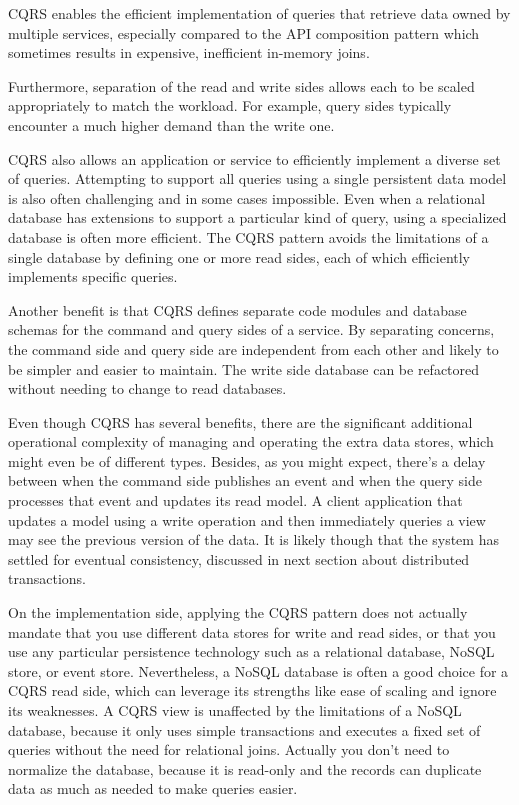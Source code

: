 \documentclass[conference]{IEEEtran}
\begin{document}
CQRS enables the efficient implementation of queries that retrieve data owned by multiple services, especially compared to the API composition pattern which sometimes results in expensive, inefficient in-memory joins.

Furthermore, separation of the read and write sides allows each to be scaled appropriately to match the workload. For example, query sides typically encounter a much higher demand than the write one.

CQRS also allows an application or service to efficiently implement a diverse set of queries. Attempting to support all queries using a single persistent data model is also often challenging and in some cases impossible. Even when a relational database has extensions to support a particular kind of query, using a specialized database is often more efficient. The CQRS pattern avoids the limitations of a single database by defining one or more read sides, each of which efficiently implements specific queries.

Another benefit is that CQRS defines separate code modules and database schemas for the command and query sides of a service. By separating concerns, the command side and query side are independent from each other and likely to be simpler and easier to maintain. The write side database can be refactored without needing to change to read databases.

Even though CQRS has several benefits, there are the significant additional operational complexity of managing and operating the extra data stores, which might even be of different types. Besides, as you might expect, there's a delay between when the command side publishes an event and when the query side processes that event and updates its read model. A client application that updates a model using a write operation and then immediately queries a view may see the previous version of the data. It is likely though that the system has settled for eventual consistency, discussed in next section about distributed transactions.

On the implementation side, applying the CQRS pattern does not actually mandate that you use different data stores for write and read sides, or that you use any particular persistence technology such as a relational database, NoSQL store, or event store. Nevertheless, a NoSQL database is often a good choice for a CQRS read side, which can leverage its strengths like ease of scaling and ignore its weaknesses. A CQRS view is unaffected by the limitations of a NoSQL database, because it only uses simple transactions and executes a fixed set of queries without the need for relational joins. Actually you don't need to normalize the database, because it is read-only and the records can duplicate data as much as needed to make queries easier.
\end{document}
